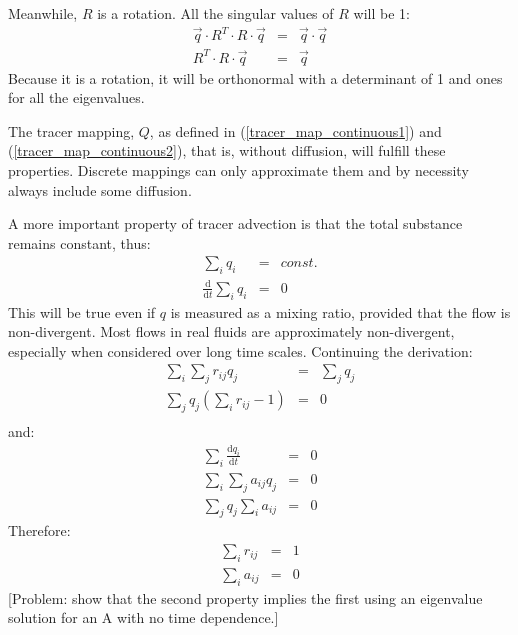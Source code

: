 \documentclass[11pt]{article}
\begin{document}
Meanwhile, $R$ is a rotation.  All the singular values of $R$ will be 1:
\begin{eqnarray}
\vec q \cdot R^T \cdot R \cdot \vec q & = & \vec q \cdot \vec q\\
R^T \cdot R \cdot \vec q & = & \vec q
\end{eqnarray}
Because it is a rotation, it will be orthonormal with a determinant of 1
and ones for all the eigenvalues.

The tracer mapping, $Q$, as defined in 
(\ref{tracer_map_continuous1}) and (\ref{tracer_map_continuous2}),
that is, without diffusion, will fulfill these properties.  Discrete mappings
can only approximate them and by necessity always include some diffusion.

A more important property of tracer advection is that the total substance
remains constant, thus:
\begin{eqnarray}
\sum_i q_i & = & const. \\
\frac{\mathrm d}{\mathrm d t}\sum_i q_i & = & 0
\end{eqnarray}
This will be true even if $q$ is measured as a mixing ratio, provided that
the flow is non-divergent.  Most flows in real fluids are approximately 
non-divergent, especially when considered over long time scales.
Continuing the derivation:
\begin{eqnarray}
\sum_i \sum_j r_{ij} q_j & = & \sum_j q_j \\
\sum_j q_j \left ( \sum_i r_{ij} - 1 \right ) & = & 0 \\
\end{eqnarray}
and:
\begin{eqnarray}
\sum_i \frac{\mathrm d q_i}{\mathrm d t} & = & 0 \\
\sum_i \sum_j a_{ij} q_j & = & 0 \\
\sum_j q_j \sum_i a_{ij} & = & 0 
\end{eqnarray}
Therefore:
\begin{eqnarray}
\sum_i r_{ij} & = & 1 
\label{column_sums_to_one}\\
\sum_i a_{ij} & = & 0
\end{eqnarray}
[Problem: show that the second property implies the first using an eigenvalue
solution for an A with no time dependence.]
\end{document}
